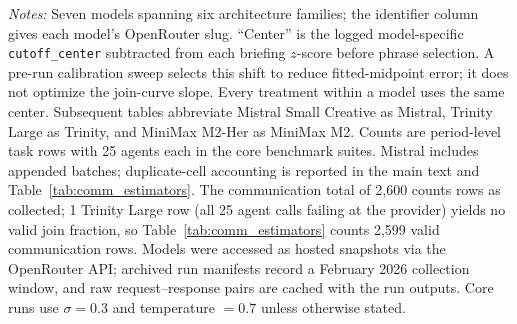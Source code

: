 \begin{table}[t]
\centering
\caption{Model summary and briefing calibration. Columns report the model-specific briefing cutoff center and period-level task rows in the private-information, communication, and falsification (scramble+flip) benchmark suites.}
\label{tab:models}
\footnotesize
\setlength{\tabcolsep}{4pt}
\begin{tablenotes}
\footnotesize\emph{Notes:} Seven models spanning six architecture families; the identifier column gives each model's OpenRouter slug. ``Center'' is the logged model-specific \texttt{cutoff\_center} subtracted from each briefing $z$-score before phrase selection. A pre-run calibration sweep selects this shift to reduce fitted-midpoint error; it does not optimize the join-curve slope. Every treatment within a model uses the same center. Subsequent tables abbreviate Mistral Small Creative as Mistral, Trinity Large as Trinity, and MiniMax M2-Her as MiniMax M2. Counts are period-level task rows with 25 agents each in the core benchmark suites. Mistral includes appended batches; duplicate-cell accounting is reported in the main text and Table~\ref{tab:comm_estimators}. The communication total of 2,600 counts rows as collected; 1 Trinity Large row (all 25 agent calls failing at the provider) yields no valid join fraction, so Table~\ref{tab:comm_estimators} counts 2,599 valid communication rows. Models were accessed as hosted snapshots via the OpenRouter API; archived run manifests record a February 2026 collection window, and raw request--response pairs are cached with the run outputs. Core runs use $\sigma = 0.3$ and temperature $= 0.7$ unless otherwise stated.
\end{tablenotes}
\end{table}
